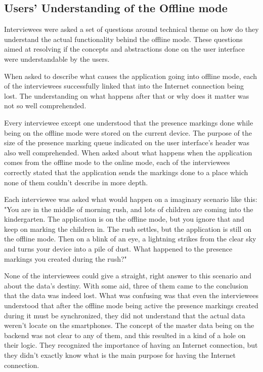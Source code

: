 



\subsection{Users' Understanding of the Offline mode}

Interviewees were asked a set of questions around technical theme on how do they understand the actual functionality behind the offline mode. These questions aimed at resolving if the concepts and abstractions done on the user interface were understandable by the users. 

When asked to describe what causes the application going into offline mode, each of the interviewees successfully linked that into the Internet connection being lost. The understanding on what happens after that or why does it matter was not so well comprehended. 

Every interviewee except one understood that the presence markings done while being on the offline mode were stored on the current device. The purpose of the size of the presence marking queue indicated on the user interface's header was also well comprehended. When asked about what happens when the application comes from the offline mode to the online mode, each of the interviewees correctly stated that the application sends the markings done to a place which none of them couldn't describe in more depth.

Each interviewee was asked what would happen on a imaginary scenario like this: "You are in the middle of morning rush, and lots of children are coming into the kindergarten. The application is on the offline mode, but you ignore that and keep on marking the children in. The rush settles, but the application is still on the offline mode. Then on a blink of an eye, a lightning strikes from the clear sky and turns your device into a pile of dust. What happened to the presence markings you created during the rush?" %

None of the interviewees could give a straight, right answer to this scenario and about the data's destiny. With some aid, three of them came to the conclusion that the data was indeed lost. What was confusing was that even the interviewees understood that after the offline mode being active the presence markings created during it must be synchronized, they did not understand that the actual data weren't locate on the smartphones. The concept of the master data being on the backend was not clear to any of them, and this resulted in a kind of a hole on their logic. They recognized the importance of having an Internet connection, but they didn't exactly know what is the main purpose for having the Internet connection.







